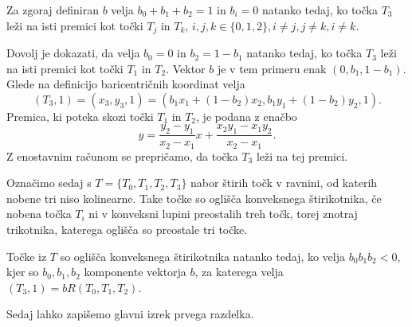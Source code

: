 \documentclass[mat1]{fmfdelo}
\begin{document}
\begin{trditev}\label{vektorp}
Za zgoraj definiran $b$ velja $b_0 + b_1 + b_2 = 1$ in $b_i = 0$ natanko tedaj, ko točka $T_3$ leži na isti premici kot točki $T_j$ in $T_k$, $i, j, k \in \{0, 1, 2 \}, i \neq j, j\neq k, i \neq k$. 
\end{trditev}

\begin{dokaz}

Dovolj je dokazati, da velja $b_0 = 0$ in $b_2 = 1 - b_1$ natanko tedaj, ko točka $T_3$ leži na isti premici kot točki $T_1$ in $T_2$.
Vektor $b$ je v tem primeru enak $(0, b_1, 1 - b_1)$. Glede na definicijo baricentričnih koordinat velja
$$(T_3, 1) = (x_3, y_3, 1) = (b_1 x_1 + (1 - b_2)x_2, b_1 y_1 + (1 - b_2) y_2, 1).$$
Premica, ki poteka skozi točki $T_1$ in $T_2$, je podana z enačbo
$$ y = \frac{y_2 - y_1}{x_2 - x_1} x + \frac{x_2 y_1 - x_1 y_2}{x_2 - x_1} .$$
Z enostavnim računom se prepričamo, da točka $T_3$ leži na tej premici.

\end{dokaz}

Označimo sedaj s $T = \{T_0, T_1, T_2, T_3 \}$ nabor štirih točk v ravnini, od katerih nobene tri niso kolinearne. Take točke so oglišča konveksnega štirikotnika, če nobena točka $T_i$ ni v konveksni lupini preostalih treh točk, torej znotraj trikotnika, katerega oglišča so preostale tri točke.

\begin{trditev}\label{konveks}
Točke iz $T$ so oglišča konveksnega štirikotnika natanko tedaj, ko velja $b_0 b_1 b_2 < 0$, kjer so $b_0, b_1, b_2$ komponente vektorja $b$, za katerega velja $(T_3, 1) = b R(T_0, T_1, T_2).$
\end{trditev}

\begin{dokaz}


\end{dokaz}

Sedaj lahko zapišemo glavni izrek prvega razdelka.
\end{document}
